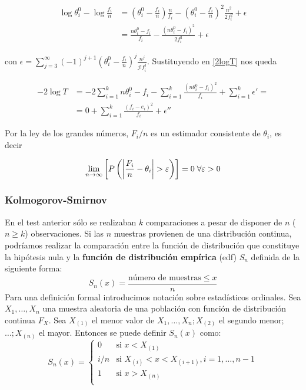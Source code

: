 	\begin{align*}	
	 \log \theta_i^0 - \log \frac{f_i}{n} & = 
			\left(
				\theta_i^0 - \frac{f_i}{n}
			\right) \frac{n}{f_i} -
			\left(
				\theta_i^0 - \frac{f_i}{n}
			\right)^2 \frac{n^2}{2f_i^2} + \epsilon \\
		&= \frac{n\theta_i^0 - f_i}{f_i} -
			\frac{(n\theta_i^0 - f_i)^2}{2f_i^2} +\epsilon
	\end{align*}
	
	con $\epsilon = \sum\limits_{j=3}^\infty
			(-1)^{j+1} 
			\left( \theta_i^0 - \frac{f_i}{n}\right)^j
			\frac{n^j}{j!f_i^j}$. Sustituyendo en \ref{2logT} nos queda
			
	\begin{align*}
	-2 \log T &= 
		-2 \sum\limits_{i=1}^k n\theta_i^0 - f_i -
		\sum\limits_{i=1}^k 
			\frac{(n\theta_i^0 - f_i)^2}{f_i} + 
		\sum\limits_{i=1}^k \epsilon' = \\
	&= 0 + 
	   \sum\limits_{i=1}^k \frac{(f_i-e_i)^2}{f_i} +
	   \epsilon''	
	\end{align*}	 
	
	Por la ley de los grandes números, $F_i/n$ es un estimador consistente de $\theta_i$, es decir
	
	\[ \lim_{n \rightarrow \infty} \left[
			P \left(
				\left\lvert \frac{F_i}{n} - \theta_i \right\rvert 
					> \varepsilon
			\right) \right] = 0 \; \forall \varepsilon > 0 \]
	
	\subsubsection{Kolmogorov-Smirnov}
	
	En el test anterior sólo se realizaban $k$ comparaciones a pesar de disponer de $n$ ($n \geq k$) observaciones. Si las $n$ muestras provienen de una distribución continua, podríamos realizar la comparación entre la función de distribución que constituye la hipótesis nula y la \textbf{función de distribución empírica} (edf) $S_n$ definida de la siguiente forma:
	\[ S_n(x) = \frac{\text{número de muestras} \leq x}{n} \]
	Para una definición formal introducimos notación sobre estadísticos ordinales. Sea $X_1, \dots, X_n$ una muestra aleatoria de una población con función de distribución continua $F_X$. Sea $X_{(1)}$ el menor valor de $X_1, \dots, X_n; X_{(2)}$ el segundo menor;$ \dots; X_{(n)}$ el mayor. Entonces se puede definir $S_n(x)$ como:
	\[ S_n(x) = 
		\left\lbrace\begin{array}{ll}
			0 & \text{si } x < X_{(1)} \\
			i/n & \text{si } X_{(i)} < x <X_{(i+1)},
				i = 1, \dots, n-1 \\
			1 & \text{si } x > X_{(n)} \\
	\end{array}\right.
	\]
	
